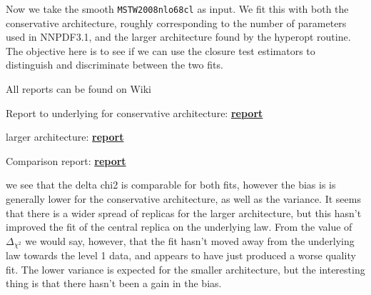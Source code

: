 \documentclass[a4paper]{article}
\newcommand{\dcs}{ \Delta_{\chi^{2}} }
\begin{document}
Now we take the smooth \texttt{MSTW2008nlo68cl} as input. We fit this
with both the conservative architecture, roughly corresponding to the number of
parameters used in NNPDF3.1, and the larger architecture found by the hyperopt
routine. The objective here is to see if we can use the closure test estimators
to distinguish and discriminate between the two fits.

All reports can be found on Wiki

Report to underlying for conservative architecture:
\href{https://vp.nnpdf.science/9qr4qCK2RHePHehBpgxBdQ==/}{\bf{report}}

larger architecture:
\href{https://vp.nnpdf.science/pdm9Y1fjTw21nhlzjzErjw==/}{\bf{report}}

Comparison report:
\href{https://vp.nnpdf.science/lQjtB-lnRy263IhAYCTw1Q==/}{\bf{report}}

we see that the delta chi2 is comparable for both fits, however the bias is
is generally lower for the conservative architecture, as well as the variance.
It seems that there is a wider spread of replicas for the larger architecture,
but this hasn't improved the fit of the central replica on the underlying law.
From the value of $\dcs$ we would say, however, that the fit hasn't moved away
from the underlying law towards the level 1 data, and appears to have just
produced a worse quality fit. The lower variance is expected for the smaller
architecture, but the interesting thing is that there hasn't been a gain in
the bias.
\end{document}
